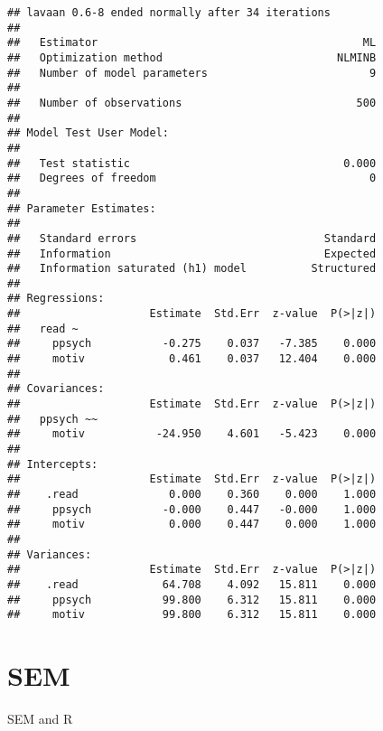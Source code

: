 \documentclass[]{book}
\begin{document}
\begin{verbatim}
## lavaan 0.6-8 ended normally after 34 iterations
## 
##   Estimator                                         ML
##   Optimization method                           NLMINB
##   Number of model parameters                         9
##                                                       
##   Number of observations                           500
##                                                       
## Model Test User Model:
##                                                       
##   Test statistic                                 0.000
##   Degrees of freedom                                 0
## 
## Parameter Estimates:
## 
##   Standard errors                             Standard
##   Information                                 Expected
##   Information saturated (h1) model          Structured
## 
## Regressions:
##                    Estimate  Std.Err  z-value  P(>|z|)
##   read ~                                              
##     ppsych           -0.275    0.037   -7.385    0.000
##     motiv             0.461    0.037   12.404    0.000
## 
## Covariances:
##                    Estimate  Std.Err  z-value  P(>|z|)
##   ppsych ~~                                           
##     motiv           -24.950    4.601   -5.423    0.000
## 
## Intercepts:
##                    Estimate  Std.Err  z-value  P(>|z|)
##    .read              0.000    0.360    0.000    1.000
##     ppsych           -0.000    0.447   -0.000    1.000
##     motiv             0.000    0.447    0.000    1.000
## 
## Variances:
##                    Estimate  Std.Err  z-value  P(>|z|)
##    .read             64.708    4.092   15.811    0.000
##     ppsych           99.800    6.312   15.811    0.000
##     motiv            99.800    6.312   15.811    0.000
\end{verbatim}

\hypertarget{sem}{%
\chapter{SEM}\label{sem}}

SEM and R


\end{document}
